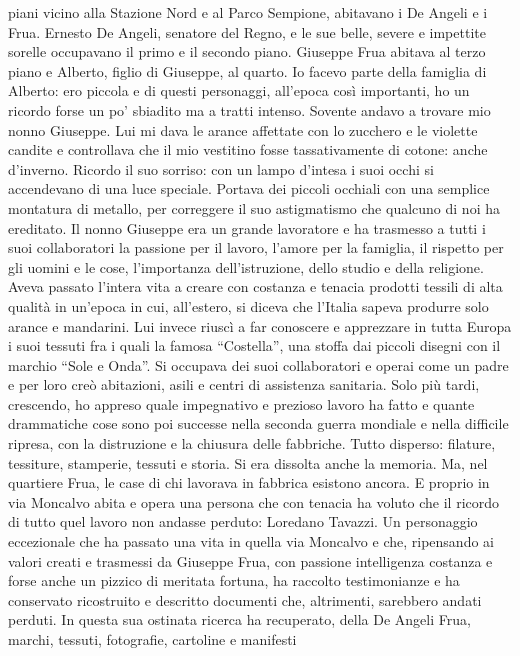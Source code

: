 piani vicino alla Stazione Nord e al Parco Sempione, abitavano i De
Angeli e i Frua. Ernesto De Angeli, senatore del Regno, e le sue belle,
severe e impettite sorelle occupavano il primo e il secondo piano.
Giuseppe Frua abitava al terzo piano e Alberto, figlio di Giuseppe, al
quarto. Io facevo parte della famiglia di Alberto: ero piccola e di
questi personaggi, all'epoca così importanti, ho un ricordo forse un po'
sbiadito ma a tratti intenso. Sovente andavo a trovare mio nonno
Giuseppe. Lui mi dava le arance affettate con lo zucchero e le violette
candite e controllava che il mio vestitino fosse tassativamente di
cotone: anche d'inverno. Ricordo il suo sorriso: con un lampo d'intesa i
suoi occhi si accendevano di una luce speciale. Portava dei piccoli
occhiali con una semplice montatura di metallo, per correggere il suo
astigmatismo che qualcuno di noi ha ereditato. Il nonno Giuseppe era un
grande lavoratore e ha trasmesso a tutti i suoi collaboratori la
passione per il lavoro, l'amore per la famiglia, il rispetto per gli
uomini e le cose, l'importanza dell'istruzione, dello studio e della
religione. Aveva passato l'intera vita a creare con costanza e tenacia
prodotti tessili di alta qualità in un'epoca in cui, all'estero, si
diceva che l'Italia sapeva produrre solo arance e mandarini. Lui invece
riuscì a far conoscere e apprezzare in tutta Europa i suoi tessuti fra i
quali la famosa ``Costella'', una stoffa dai piccoli disegni con il
marchio ``Sole e Onda''. Si occupava dei suoi collaboratori e operai
come un padre e per loro creò abitazioni, asili e centri di assistenza
sanitaria. Solo più tardi, crescendo, ho appreso quale impegnativo e
prezioso lavoro ha fatto e quante drammatiche cose sono poi successe
nella seconda guerra mondiale e nella difficile ripresa, con la
distruzione e la chiusura delle fabbriche. Tutto disperso: filature,
tessiture, stamperie, tessuti e storia. Si era dissolta anche la
memoria. Ma, nel quartiere Frua, le case di chi lavorava in fabbrica
esistono ancora. E proprio in via Moncalvo abita e opera una persona che
con tenacia ha voluto che il ricordo di tutto quel lavoro non andasse
perduto: Loredano Tavazzi. Un personaggio eccezionale che ha passato una
vita in quella via Moncalvo e che, ripensando ai valori creati e
trasmessi da Giuseppe Frua, con passione intelligenza costanza e forse
anche un pizzico di meritata fortuna, ha raccolto testimonianze e ha
conservato ricostruito e descritto documenti che, altrimenti, sarebbero
andati perduti. In questa sua ostinata ricerca ha recuperato, della De
Angeli Frua, marchi, tessuti, fotografie, cartoline e manifesti
